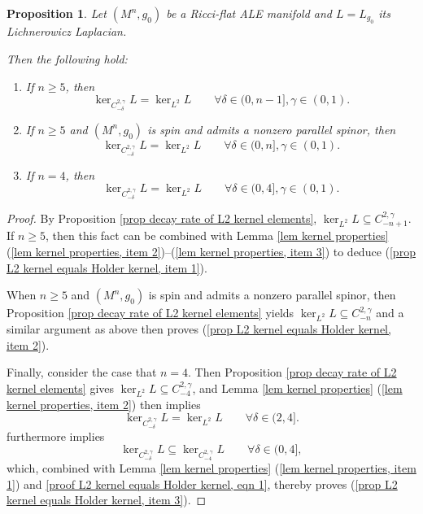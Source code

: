 \documentclass[12pt]{amsart}
\renewcommand{\1}{{\mathbf 1}}
\newcommand{\R}{{\mathbb R}}
\newtheorem{prop}[thm]{Proposition}
\theoremstyle{others}
\numberwithin{equation}{section}
\begin{document}
\begin{prop} \label{prop L2 kernel equals Holder kernel}
    Let $(M^n, g_0)$ be a Ricci-flat ALE manifold and $L = L_{g_0}$ its Lichnerowicz Laplacian.

    Then the following hold:
    \begin{enumerate}
        \item \label{prop L2 kernel equals Holder kernel, item 1}
        If $n \ge 5$, then
        $$\ker_{C^{2, \gamma}_{-\delta}} L = \ker_{L^2} L \qquad \forall \delta \in (0, n-1], \gamma \in (0,1).$$

        \item \label{prop L2 kernel equals Holder kernel, item 2}
        If $n \ge 5$ and $(M^n, g_0)$ is spin and admits a nonzero parallel spinor, then 
            $$\ker_{C^{2, \gamma}_{-\delta}} L = \ker_{L^2} L \qquad \forall \delta \in (0, n], \gamma \in (0,1).$$

        \item \label{prop L2 kernel equals Holder kernel, item 3}
        If $n = 4$, then
        $$\ker_{C^{2, \gamma}_{-\delta}} L = \ker_{L^2} L \qquad \forall \delta \in (0, 4], \gamma \in (0,1).$$
        
    \end{enumerate}
\end{prop}
\begin{proof}
    By Proposition \ref{prop decay rate of L2 kernel elements}, $\ker_{L^2} L \subseteq C^{2, \gamma}_{-n+1}$.
    If $n\ge 5$, then this fact can be combined with Lemma \ref{lem kernel properties} (\ref{lem kernel properties, item 2})--(\ref{lem kernel properties, item 3}) to deduce (\ref{prop L2 kernel equals Holder kernel, item 1}).

    When $n \ge 5$ and $(M^n, g_0)$ is spin and admits a nonzero parallel spinor, then Proposition \ref{prop decay rate of L2 kernel elements} yields $\ker_{L^2} L \subseteq C^{2, \gamma}_{-n}$ and a similar argument as above then proves (\ref{prop L2 kernel equals Holder kernel, item 2}).

    Finally, consider the case that $n=4$.
    Then Proposition \ref{prop decay rate of L2 kernel elements} gives $\ker_{L^2}L \subseteq C^{2, \gamma}_{-4}$, and Lemma \ref{lem kernel properties} (\ref{lem kernel properties, item 2}) then implies
    \begin{equation} \label{proof L2 kernel equals Holder kernel, eqn 1}
        \ker_{C^{2, \gamma}_{-\delta}} L = \ker_{L^2} L \qquad \forall \delta \in (2, 4].
    \end{equation}
    \cite[Lemma 4.2]{Ozuch22} furthermore implies 
        $$\ker_{C^{2, \gamma}_{-\delta}} L \subseteq \ker_{C^{2, \gamma}_{-4}} L \qquad \forall \delta \in (0, 4],$$
    which, combined with Lemma \ref{lem kernel properties} (\ref{lem kernel properties, item 1}) and \eqref{proof L2 kernel equals Holder kernel, eqn 1}, thereby proves (\ref{prop L2 kernel equals Holder kernel, item 3}).
\end{proof}
\end{document}
